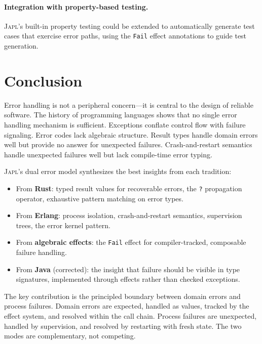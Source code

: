 \documentclass[11pt,twocolumn]{article}
\newcommand{\japl}{\textsc{Japl}}
\newcommand{\Fail}{\texttt{Fail}}
\begin{document}
\paragraph{Integration with property-based testing.} \japl{}'s built-in property testing could be extended to automatically generate test cases that exercise error paths, using the \Fail{} effect annotations to guide test generation.

\section{Conclusion}\label{sec:conclusion}

Error handling is not a peripheral concern---it is central to the design of reliable software. The history of programming languages shows that no single error handling mechanism is sufficient. Exceptions conflate control flow with failure signaling. Error codes lack algebraic structure. Result types handle domain errors well but provide no answer for unexpected failures. Crash-and-restart semantics handle unexpected failures well but lack compile-time error typing.

\japl{}'s dual error model synthesizes the best insights from each tradition:

\begin{itemize}[leftmargin=*]
  \item From \textbf{Rust}: typed result values for recoverable errors, the \texttt{?} propagation operator, exhaustive pattern matching on error types.
  \item From \textbf{Erlang}: process isolation, crash-and-restart semantics, supervision trees, the error kernel pattern.
  \item From \textbf{algebraic effects}: the \Fail{} effect for compiler-tracked, composable failure handling.
  \item From \textbf{Java} (corrected): the insight that failure should be visible in type signatures, implemented through effects rather than checked exceptions.
\end{itemize}

The key contribution is the principled boundary between domain errors and process failures. Domain errors are expected, handled as values, tracked by the effect system, and resolved within the call chain. Process failures are unexpected, handled by supervision, and resolved by restarting with fresh state. The two modes are complementary, not competing.
\end{document}
